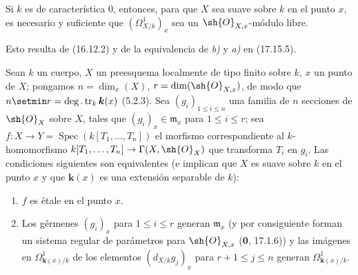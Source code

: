 \begin{corollary}[17.15.7]
\label{IV.17.15.7}
Si $k$ es de característica \textup{0}, entonces, para que $X$ sea suave sobre $k$ en el punto $x$, es necesario y suficiente que $(\varOmega^1_{X/k})_x$ sea un $\sh{O}_{X,x}$-módulo libre.
\end{corollary}

Esto resulta de (16.12.2) y de la equivalencia de \emph{b)} y \emph{a)} en (17.15.5).

\begin{proposition}[17.15.8]
\label{IV.17.15.8}
Sean $k$ un cuerpo, $X$ un preesquema localmente de tipo finito sobre $k$, $x$ un punto de $X$; pongamos $n=\dim_x(X)$, $r=\dim(\sh{O}_{X,x})$, de modo que $n\setmin r=\deg.\operatorname{tr}_k \boldsymbol{k}(x)$ \textup{(5.2.3)}. Sea $(g_i)_{1\leq i\leq n}$ una familia de $n$ secciones de $\sh{O}_X$ sobre $X$, tales que $(g_i)_x\in\mathfrak m_x$ para $1\leq i\leq r$; sea $f:X\to Y=\operatorname{Spec}(k[T_1,\ldots,T_n])$ el morfismo correspondiente al $k$-homomorfismo $k[T_1,\ldots,T_n]\to\Gamma(X,\sh{O}_X)$ que transforma $T_i$ en $g_i$. Las condiciones siguientes son equivalentes (e implican que $X$ es suave sobre $k$ en el punto $x$ y que $\boldsymbol{k}(x)$ es una extensión separable de $k$):
\begin{enumerate}
  \item[\textup{a)}] $f$ es étale en el punto $x$.


  \item[\textup{b)}] Los gérmenes $(g_i)_x$ para $1\leq i\leq r$ generan $\mathfrak m_x$ \textup{(y por consiguiente forman un sistema regular de parámetros para $\sh{O}_{X,x}$ (\textbf 0, 17.1.6))} y las imágenes en $\Omega^1_{\mathbf{k}(x)/k}$ de los elementos $(d_{X/k}g_j)_x$ para $r+1\leq j\leq n$ generan $\Omega^1_{\mathbf{k}(x)/k}$.
\end{enumerate}
\end{proposition}

